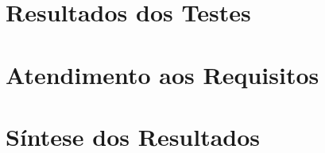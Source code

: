 
\section{Resultados dos Testes}
\label{sec:resultados-testes}



\section{Atendimento aos Requisitos}
\label{sec:atendimento-requisitos}


\section{Síntese dos Resultados}
\label{sec:sintese-resultados}

